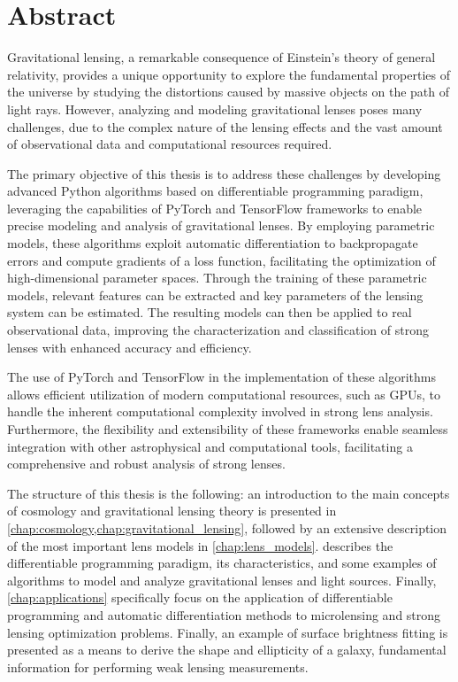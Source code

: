 \chapter*{Abstract}
\pagestyle{empty}

Gravitational lensing, a remarkable consequence of Einstein's theory of general relativity, provides a unique opportunity to explore the fundamental properties of the universe by studying the distortions caused by massive objects on the path of light rays. However, analyzing and modeling gravitational lenses poses many challenges, due to the complex nature of the lensing effects and the vast amount of observational data and computational resources required.

The primary objective of this thesis is to address these challenges by developing advanced Python algorithms based on differentiable programming paradigm, leveraging the capabilities of PyTorch and TensorFlow frameworks to enable precise modeling and analysis of gravitational lenses. By employing parametric models, these algorithms exploit automatic differentiation to backpropagate errors and compute gradients of a loss function, facilitating the optimization of high-dimensional parameter spaces. 
Through the training of these parametric models, relevant features can be extracted and key parameters of the lensing system can be estimated. The resulting models can then be applied to real observational data, improving the characterization and classification of strong lenses with enhanced accuracy and efficiency.

The use of PyTorch and TensorFlow in the implementation of these algorithms allows efficient utilization of modern computational resources, such as GPUs, to handle the inherent computational complexity involved in strong lens analysis. Furthermore, the flexibility and extensibility of these frameworks enable seamless integration with other astrophysical and computational tools, facilitating a comprehensive and robust analysis of strong lenses.

The structure of this thesis is the following: an introduction to the main concepts of cosmology and gravitational lensing theory is presented in \cref{chap:cosmology,chap:gravitational_lensing}, followed by an extensive description of the most important lens models in \cref{chap:lens_models}.  describes the differentiable programming paradigm, its characteristics, and some examples of algorithms to model and analyze gravitational lenses and light sources. Finally, \cref{chap:applications} specifically focus on the application of differentiable programming and automatic differentiation methods to microlensing and strong lensing optimization problems. Finally, an example of surface brightness fitting is presented as a means to derive the shape and ellipticity of a galaxy, fundamental information for performing weak lensing measurements.